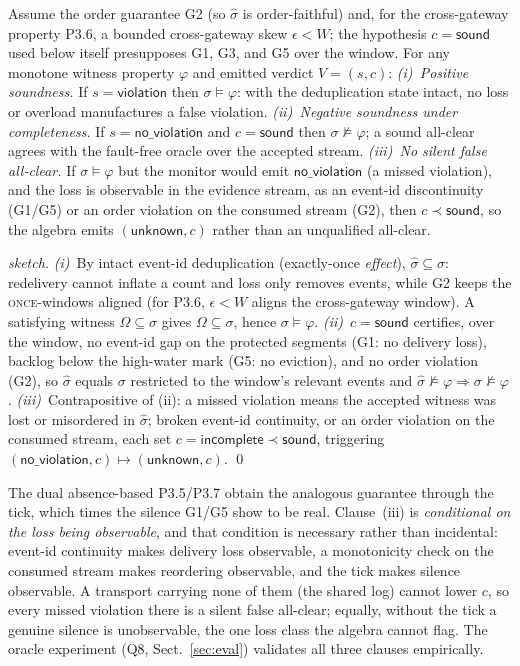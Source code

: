 \documentclass[runningheads]{llncs}
\begin{document}
\begin{proposition}
\label{prop:soundness}
Assume the order guarantee G2 (so $\hat\sigma$ is order-faithful) and, for the
cross-gateway property P3.6, a bounded cross-gateway skew $\epsilon<W$; the hypothesis
$c=\mathsf{sound}$ used below itself presupposes G1, G3, and G5 over the window. For any
monotone witness property $\varphi$ and emitted verdict $V=(s,c)$:
\emph{(i)~Positive soundness.} If $s=\mathsf{violation}$ then $\sigma\models\varphi$:
with the deduplication state intact, no loss or overload manufactures a false violation.
\emph{(ii)~Negative soundness under completeness.} If $s=\mathsf{no\_violation}$ and
$c=\mathsf{sound}$ then $\sigma\not\models\varphi$; a sound all-clear agrees with the
fault-free oracle over the accepted stream.
\emph{(iii)~No silent false all-clear.} If $\sigma\models\varphi$ but the monitor would
emit $\mathsf{no\_violation}$ (a missed violation), and the loss is observable in the
evidence stream, as an event-id discontinuity (G1/G5) or an order violation on the
consumed stream (G2), then $c\prec\mathsf{sound}$, so the algebra emits
$(\mathsf{unknown},c)$ rather than an unqualified all-clear.
\end{proposition}

\begin{proof}[sketch]
\emph{(i)}~By intact event-id deduplication (exactly-once \emph{effect}),
$\hat\sigma\subseteq\sigma$: redelivery cannot inflate a count and loss only removes
events, while G2 keeps the \textsc{once}-windows aligned (for P3.6, $\epsilon<W$ aligns the
cross-gateway window). A satisfying witness $\Omega\subseteq\hat\sigma$ gives
$\Omega\subseteq\sigma$, hence $\sigma\models\varphi$.
\emph{(ii)}~$c=\mathsf{sound}$ certifies, over the window, no event-id gap on the
protected segments (G1: no delivery loss), backlog below the high-water mark (G5: no
eviction), and no order violation (G2), so $\hat\sigma$ equals $\sigma$ restricted to
the window's relevant events and
$\hat\sigma\not\models\varphi\Rightarrow\sigma\not\models\varphi$.
\emph{(iii)}~Contrapositive of (ii): a missed violation means the accepted witness was
lost or misordered in $\hat\sigma$; broken event-id continuity, or an order violation
on the consumed stream, each set $c=\mathsf{incomplete}\prec\mathsf{sound}$, triggering
$(\mathsf{no\_violation},c)\mapsto(\mathsf{unknown},c)$.
\qed
\end{proof}

The dual absence-based P3.5/P3.7 obtain the analogous guarantee through the tick, which
times the silence G1/G5 show to be real. Clause~(iii) is \emph{conditional on the loss being
observable}, and that condition is necessary rather than incidental: event-id continuity
makes delivery loss observable, a monotonicity check on the consumed stream makes
reordering observable, and the tick makes silence observable. A transport carrying none of
them (the shared log) cannot lower $c$, so every missed violation there is a silent false
all-clear; equally, without the tick a genuine silence is unobservable, the one loss class
the algebra cannot flag. The oracle experiment (Q8, Sect.~\ref{sec:eval}) validates all
three clauses empirically.
\end{document}
